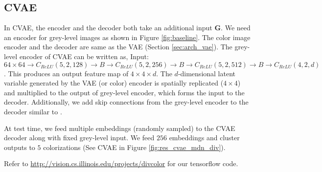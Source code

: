 \documentclass[10pt,twocolumn,letterpaper]{article}
\begin{document}
\subsection{CVAE}\label{sec:arch_cvae}
In CVAE, the encoder and the decoder both take an additional input $\mathbf{G}$. 
We need an encoder for grey-level images as shown in Figure \ref{fig:baseline}.  The
color image encoder and the decoder are same as the VAE (Section \ref{sec:arch_vae}). The grey-level 
encoder of CVAE can be written as, Input: $64 \times 64 \rightarrow C_{ReLU}(5, 2, 128) \rightarrow B 
\rightarrow C_{ReLU}(5, 2, 256) \rightarrow B \rightarrow C_{ReLU}(5, 2, 512) \rightarrow B 
\rightarrow C_{ReLU}(4, 2, d)$. This produces an output feature map of $4 \times 4 \times d$. 
The $d$-dimensional latent variable generated by the VAE (or color) encoder is spatially 
replicated ($4 \times 4$) and multiplied to the output of grey-level encoder, which forms
the input to the decoder. Additionally, we add skip connections from the grey-level encoder to the 
decoder similar to \cite{Isola}.

At test time, we feed multiple embeddings (randomly sampled) to the CVAE decoder along with 
fixed grey-level input. We feed $256$ embeddings and 
cluster outputs to $5$ colorizations (See CVAE in Figure \ref{fig:res_cvae_mdn_div}). 

Refer to \url{http://vision.cs.illinois.edu/projects/divcolor} for our tensorflow code.
\end{document}
